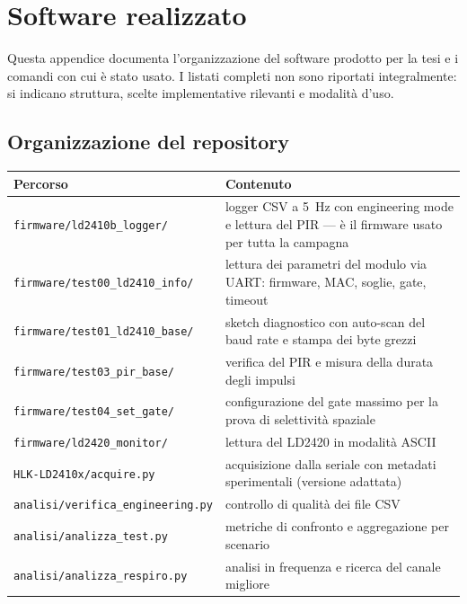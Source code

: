 \chapter{Software realizzato}
\label{app:codice}

Questa appendice documenta l'organizzazione del software prodotto per la tesi e i
comandi con cui è stato usato. I listati completi non sono riportati integralmente:
si indicano struttura, scelte implementative rilevanti e modalità d'uso.

\section{Organizzazione del repository}

\begin{center}\small
\begin{tabularx}{\textwidth}{@{}lX@{}}
\toprule
\textbf{Percorso} & \textbf{Contenuto} \\
\midrule
\texttt{firmware/ld2410b\_logger/} & logger CSV a 5~Hz con engineering mode e
  lettura del PIR --- è il firmware usato per tutta la campagna \\
\texttt{firmware/test00\_ld2410\_info/} & lettura dei parametri del modulo via
  UART: firmware, MAC, soglie, gate, timeout \\
\texttt{firmware/test01\_ld2410\_base/} & sketch diagnostico con auto-scan del baud
  rate e stampa dei byte grezzi \\
\texttt{firmware/test03\_pir\_base/} & verifica del PIR e misura della durata degli
  impulsi \\
\texttt{firmware/test04\_set\_gate/} & configurazione del gate massimo per la prova
  di selettività spaziale \\
\texttt{firmware/ld2420\_monitor/} & lettura del LD2420 in modalità ASCII \\
\texttt{HLK-LD2410x/acquire.py} & acquisizione dalla seriale con metadati
  sperimentali (versione adattata) \\
\texttt{analisi/verifica\_engineering.py} & controllo di qualità dei file CSV \\
\texttt{analisi/analizza\_test.py} & metriche di confronto e aggregazione per
  scenario \\
\texttt{analisi/analizza\_respiro.py} & analisi in frequenza e ricerca del canale
  migliore \\
\bottomrule
\end{tabularx}
\end{center}

